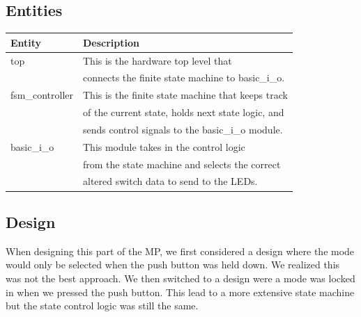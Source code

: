 \documentclass[letterpaper, 10 pt, conference]{IEEEconf}  %
\begin{document}
\subsection{Entities}
\begin{table}[H]
\begin{tabular}{|l|l|}
\hline
\rowcolor[HTML]{EFEFEF} 
Entity      & Description                           \\ \hline
top & This is the hardware top level that \\ &connects the finite state machine to basic\_i\_o. \\ \hline
fsm\_controller &  This is the finite state machine that keeps track \\ &of the current state,  holds next state logic,  and \\& sends control signals to the basic\_i\_o module. \\ \hline
basic\_i\_o & This module takes in the control logic \\& from the state machine and selects the correct \\& altered  switch data to send to the LEDs. \\ \hline
\end{tabular}
\end{table}

\subsection{Design}
When designing this part of the MP, we first considered a design where the mode would only be selected when the push button was held down. We realized this was not the best approach. We then switched to a design were a mode was locked in when we pressed the push button. This lead to a more extensive state machine but the state control logic was still the same. 
\end{document}
